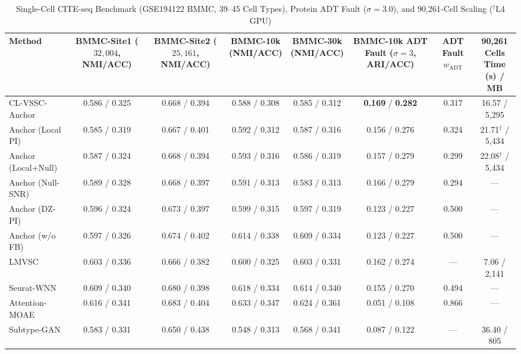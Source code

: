 \begin{table}[t]
\centering
\caption{Single-Cell CITE-seq Benchmark (GSE194122 BMMC, 39--45 Cell Types), Protein ADT Fault ($\sigma=3.0$), and 90{,}261-Cell Scaling ($^\dagger$L4 GPU)}
\label{tab:p2_singlecell}
\scriptsize
\renewcommand{\arraystretch}{1.14}
\setlength{\tabcolsep}{2.0pt}
\begin{tabular}{lccccccc}
\toprule
Method & \shortstack{BMMC-Site1\\($32{,}004$, NMI/ACC)} & \shortstack{BMMC-Site2\\($25{,}161$, NMI/ACC)} & \shortstack{BMMC-10k\\(NMI/ACC)} & \shortstack{BMMC-30k\\(NMI/ACC)} & \shortstack{BMMC-10k ADT Fault\\($\sigma=3$, ARI/ACC)} & \shortstack{ADT Fault\\$w_{\mathrm{ADT}}$} & \shortstack{90{,}261 Cells\\Time (s) / MB} \\
\midrule
CL-VSSC-Anchor & 0.586 / 0.325 & 0.668 / 0.394 & 0.588 / 0.308 & 0.585 / 0.312 & \textbf{0.169} / \textbf{0.282} & 0.317 & 16.57 / 5,295 \\
Anchor (Local PI) & 0.585 / 0.319 & 0.667 / 0.401 & 0.592 / 0.312 & 0.587 / 0.316 & 0.156 / 0.276 & 0.324 & 21.71$^\dagger$ / 5,434 \\
Anchor (Local+Null) & 0.587 / 0.324 & 0.668 / 0.394 & 0.593 / 0.316 & 0.586 / 0.319 & 0.157 / 0.279 & 0.299 & 22.08$^\dagger$ / 5,434 \\
Anchor (Null-SNR) & 0.589 / 0.328 & 0.668 / 0.397 & 0.591 / 0.313 & 0.583 / 0.313 & 0.166 / 0.279 & 0.294 & --- \\
Anchor (DZ-PI) & 0.596 / 0.324 & 0.673 / 0.397 & 0.599 / 0.315 & 0.597 / 0.319 & 0.123 / 0.227 & 0.500 & --- \\
Anchor (w/o FB) & 0.597 / 0.326 & 0.674 / 0.402 & 0.614 / 0.338 & 0.609 / 0.334 & 0.123 / 0.227 & 0.500 & --- \\
LMVSC & 0.603 / 0.336 & 0.666 / 0.382 & 0.600 / 0.325 & 0.603 / 0.331 & 0.162 / 0.274 & --- & 7.06 / 2,141 \\
Seurat-WNN & 0.609 / 0.340 & 0.680 / 0.398 & 0.618 / 0.334 & 0.614 / 0.340 & 0.155 / 0.270 & 0.494 & --- \\
Attention-MOAE & 0.616 / 0.341 & 0.683 / 0.404 & 0.633 / 0.347 & 0.624 / 0.361 & 0.051 / 0.108 & 0.866 & --- \\
Subtype-GAN & 0.583 / 0.331 & 0.650 / 0.438 & 0.548 / 0.313 & 0.568 / 0.341 & 0.087 / 0.122 & --- & 36.40 / 805 \\
\bottomrule
\end{tabular}
\end{table}
